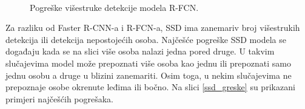 \begin{figure}[H]
 \
\caption{Pogreške višestruke detekcije modela R-FCN.}
\label{rfcn_greske}
\end{figure}

Za razliku od Faster R-CNN-a i R-FCN-a, SSD ima zanemariv broj višestrukih detekcija ili detekcija nepostojećih osoba. Najčešće pogreške SSD modela se događaju kada se na slici više osoba nalazi jedna pored druge. U takvim slučajevima model može prepoznati više osoba kao jednu ili prepoznati samo jednu osobu a druge u blizini zanemariti. Osim toga, u nekim slučajevima ne prepoznaje osobe okrenute leđima ili bočno. Na slici \ref{ssd_greske} su prikazani primjeri najčešćih pogrešaka. 

